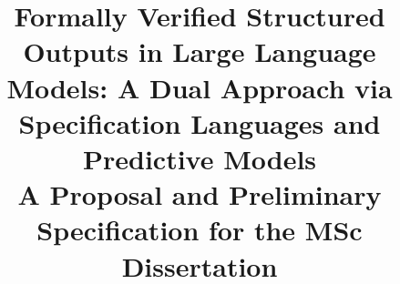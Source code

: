 \title{Formally Verified Structured Outputs in Large Language Models: A Dual Approach via Specification Languages and Predictive Models\\
  {\footnotesize A Proposal and Preliminary Specification for the MSc Dissertation}
}

\author{
}

\maketitle

